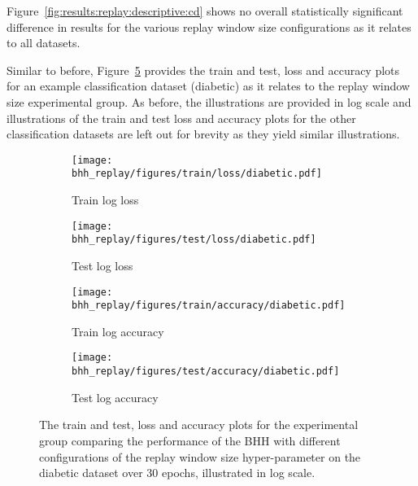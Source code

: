 Figure~\ref{fig:results:replay:descriptive:cd} shows no overall statistically significant difference in results for the various replay window size configurations as it relates to all datasets.

Similar to before, Figure~\ref{fig:results:replay:figures:diabetic} provides the train and test, loss and accuracy plots for an example classification dataset (diabetic) as it relates to the replay window size experimental group. As before, the illustrations are provided in log scale and illustrations of the train and test loss and accuracy plots for the other classification datasets are left out for brevity as they yield similar illustrations.

\begin{figure}[htbp]
      \begin{subfigure}{0.5\textwidth}
            \centering
            \texttt{[image: bhh\_replay/figures/train/loss/diabetic.pdf]}
            \caption{Train log loss}
            \label{fig:results:replay:figures:loss:train:diabetic}
      \end{subfigure}
      \begin{subfigure}{0.5\textwidth}
            \centering
            \texttt{[image: bhh\_replay/figures/test/loss/diabetic.pdf]}
            \caption{Test log loss}
            \label{fig:results:replay:figures:loss:test:diabetic}
      \end{subfigure}
      \par\bigskip
      \begin{subfigure}{0.5\textwidth}
            \centering
            \texttt{[image: bhh\_replay/figures/train/accuracy/diabetic.pdf]}
            \caption{Train log accuracy}
            \label{fig:results:replay:figures:accuracy:train:diabetic}
      \end{subfigure}
      \begin{subfigure}{0.5\textwidth}
            \centering
            \texttt{[image: bhh\_replay/figures/test/accuracy/diabetic.pdf]}
            \caption{Test log accuracy}
            \label{fig:results:replay:figures:accuracy:test:diabetic}
      \end{subfigure}
      \par\bigskip
      \caption{The train and test, loss and accuracy plots for the experimental group comparing the performance of the \acs{BHH} with different configurations of the replay window size hyper-parameter on the diabetic dataset over 30 epochs, illustrated in log scale.}
      \label{fig:results:replay:figures:diabetic}
\end{figure}


